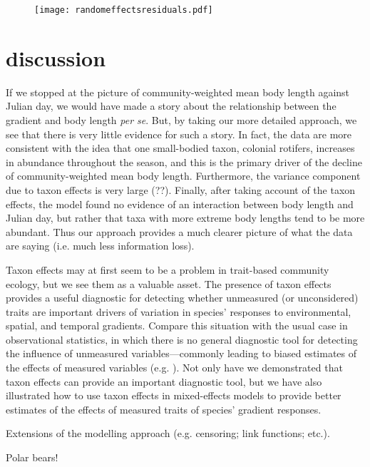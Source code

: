 \documentclass[12pt]{ecology}
\begin{document}
\begin{figure}
\texttt{[image: randomeffectsresiduals.pdf]}
\caption{}
\label{fig:randomeffectsresiduals}
\end{figure}

\section{discussion}

If we stopped at the picture of community-weighted mean body length against Julian day, we would have made a story about the relationship between the gradient and body length \emph{per se}.  But, by taking our more detailed approach, we see that there is very little evidence for such a story.  In fact, the data are more consistent with the idea that one small-bodied taxon, colonial rotifers, increases in abundance throughout the season, and this is the primary driver of the decline of community-weighted mean body length.  Furthermore, the variance component due to taxon effects is very large (??).  Finally, after taking account of the taxon effects, the model found no evidence of an interaction between body length and Julian day, but rather that taxa with more extreme body lengths tend to be more abundant.  Thus our approach provides a much clearer picture of what the data are saying (i.e. much less information loss).

Taxon effects may at first seem to be a problem in trait-based community ecology, but we see them as a valuable asset.  The presence of taxon effects provides a useful diagnostic for detecting whether unmeasured (or unconsidered) traits are important drivers of variation in species' responses to environmental, spatial, and temporal gradients.  Compare this situation with the usual case in observational statistics, in which there is no general diagnostic tool for detecting the influence of unmeasured variables---commonly leading to biased estimates of the effects of measured variables (e.g. ).  Not only have we demonstrated that taxon effects can provide an important diagnostic tool, but we have also illustrated how to use taxon effects in mixed-effects models to provide better estimates of the effects of measured traits of species' gradient responses.

Extensions of the modelling approach (e.g. censoring; link functions; etc.).


Polar bears!



\end{document}
